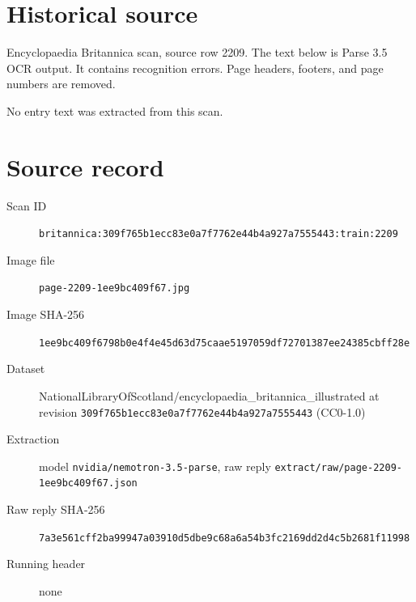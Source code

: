 \documentclass{article}
\begin{document}
\section*{Historical source}
Encyclopaedia Britannica scan, source row 2209. The text below is Parse 3.5 OCR output. It contains recognition errors.
Page headers, footers, and page numbers are removed.

No entry text was extracted from this scan.

\section*{Source record}
\begin{description}
\item[Scan ID] \texttt{britannica:309f765b1ecc83e0a7f7762e44b4a927a7555443:train:2209}
\item[Image file] \texttt{page-2209-1ee9bc409f67.jpg}
\item[Image SHA-256] \texttt{1ee9bc409f6798b0e4f4e45d63d75caae5197059df72701387ee24385cbff28e}
\item[Dataset] NationalLibraryOfScotland/encyclopaedia\_britannica\_illustrated at revision \texttt{309f765b1ecc83e0a7f7762e44b4a927a7555443} (CC0-1.0)
\item[Extraction] model \texttt{nvidia/nemotron-3.5-parse}, raw reply \texttt{extract/raw/page-2209-1ee9bc409f67.json}
\item[Raw reply SHA-256] \texttt{7a3e561cff2ba99947a03910d5dbe9c68a6a54b3fc2169dd2d4c5b2681f11998}

\item[Running header] none
\end{description}
\end{document}
